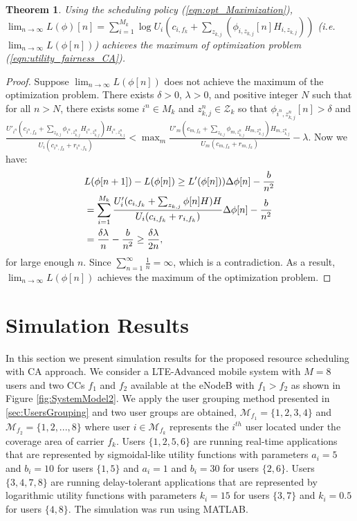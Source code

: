 \documentclass[conference]{IEEEtran}
\newtheorem{thm}{Theorem}[section]
\begin{document}
\vspace{-1.3em}
\begin{thm}\label{thm:limitmax}
Using the scheduling policy (\ref{eqn:opt_Maximization}), $\lim_{n \rightarrow \infty}L(\phi)[n]=\sum_{i=1}^{M_k}\log U_i(c_{i,f_k}+\sum_{z_{k,j}}(\phi_{i,z_{k,j}}[n] H_{i,z_{k,j}}))$ (i.e. $\lim_{n \rightarrow \infty}L(\phi[n])$) achieves the maximum of optimization problem (\ref{eqn:utility_fairness_CA}).
\end{thm}
\begin{proof}
Suppose $\lim_{n \rightarrow \infty}L(\phi[n])$ does not achieve the maximum of the optimization problem. There exists $\delta >   0$, $\lambda > 0$, and positive integer $N$ such that for all $n > N$, there exists some $i^n \in M_k$ and $z_{k,j}^n \in \mathcal{Z}_k$ so that $\phi_{i^n,z_{k,j}^n}[n]>\delta$ and  $\frac{U'_{i^n}(c_{i^n,f_k}+\sum_{z_{k,j}}\phi_{i^n,z_{k,j}^n}H_{i^n,z_{k,j}^n})H_{i^n,z_{k,j}^n}}{U_i(c_{i^n,f_k}+r_{i^n,f_k})}<\max_m \frac{U'_m(c_{m,f_k}+\sum_{z_{k,j}}\phi_{m,z_{k,j}^n}H_{m,z_{k,j}^n})H_{m,z_{k,j}^n}}{U_m(c_{m,f_k}+r_{m,f_k})}-\lambda$. Now we have:
\vspace{-0.7em}
\begin{equation*}\label{eqn:L_maximize}
\begin{aligned}
& L(\phi[n+1])-L(\phi[n]) \geq L'(\phi[n]))\Delta \phi[n]-\frac{b}{n^2}\\
& =\sum_{i=1}^{M_k}\frac{U'_i(c_{i,f_k}+\sum_{z_{k,j}}\phi[n]H)H}{U_i(c_{i,f_k}+r_{i,f_k})}
\Delta\phi[n]-\frac{b}{n^2}\\
& =\frac{\delta\lambda}{n}-\frac{b}{n^2} \geq \frac{\delta\lambda}{2n},
\vspace{-1em}
\end{aligned}
\end{equation*}
for large enough $n$. Since $\sum_{n=1}^\infty \frac{1}{n}=\infty$, which is a contradiction. As a result, $\lim_{n \rightarrow \infty}L(\phi[n])$ achieves the maximum of the optimization problem.
\end{proof}
\vspace{-0.08in}
\section{Simulation Results}\label{sec:sim}
In this section we present simulation results for the proposed resource scheduling with CA approach. We consider a LTE-Advanced mobile system with $M=8$ users and two CCs $f_1$ and $f_2$ available at the eNodeB with $f_1>f_2$ as shown in Figure \ref{fig:SystemModel2}. We apply the user grouping method presented in \ref{sec:UsersGrouping} and two user groups are obtained, $\mathcal{M}_{f_1}=\{1,2,3,4\}$ and $\mathcal{M}_{f_2}=\{1,2,...,8\}$ where user $i \in \mathcal{M}_{f_k}$ represents the $i^{th}$ user located under the coverage area of carrier $f_k$. Users $\{1,2,5,6\}$ are running real-time applications that are represented by sigmoidal-like utility functions with parameters $a_i = 5$ and $b_i=10$ for users $\{1,5\}$ and $a_i = 1$ and $b_i=30$ for users $\{2,6\}$. Users $\{3,4,7,8\}$ are running delay-tolerant applications that are represented by logarithmic utility functions with parameters $k_i = 15$ for users $\{3,7\}$ and $k_i = 0.5$ for users $\{4,8\}$. The simulation was run using MATLAB.
\end{document}
